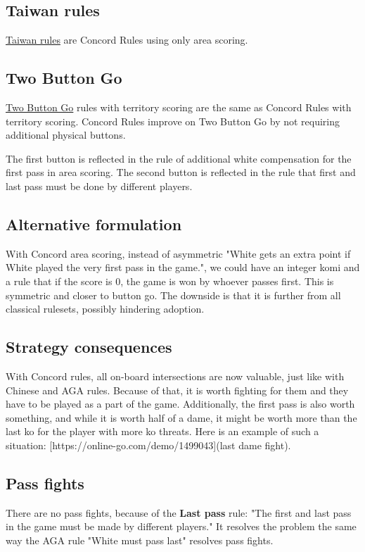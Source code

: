 \documentclass[11pt]{article}
\begin{document}
\subsection*{Taiwan rules}
\href{https://senseis.xmp.net/?TaiwanRules}{Taiwan rules} are Concord Rules using only area scoring.

\subsection*{Two Button Go}
\href{https://senseis.xmp.net/?TwoButtonGo}{Two Button Go} rules with territory scoring are the same as Concord Rules with territory scoring.
Concord Rules improve on Two Button Go by not requiring additional physical buttons.

The first button is reflected in the rule of additional white compensation for the first pass in area scoring.
The second button is reflected in the rule that first and last pass must be done by different players.

\subsection*{Alternative formulation}
With Concord area scoring, instead of asymmetric "White gets an extra point if White played the very first pass in the game.", we could have an integer komi and a rule that if the score is 0, the game is won by whoever passes first.
This is symmetric and closer to button go. The downside is that it is further from all classical rulesets, possibly hindering adoption.

\subsection*{Strategy consequences}
With Concord rules, all on-board intersections are now valuable, just like with Chinese and AGA rules.
Because of that, it is worth fighting for them and they have to be played as a part of the game.
Additionally, the first pass is also worth something, and while it is worth half of a dame, it might be worth more than the last ko for the player with more ko threats.
Here is an example of such a situation: [https://online-go.com/demo/1499043](last dame fight).

\subsection*{Pass fights}
There are no pass fights, because of the \textbf{Last pass} rule: "The first and last pass in the game must be made by different players."
It resolves the problem the same way the AGA rule "White must pass last" resolves pass fights.
\end{document}
